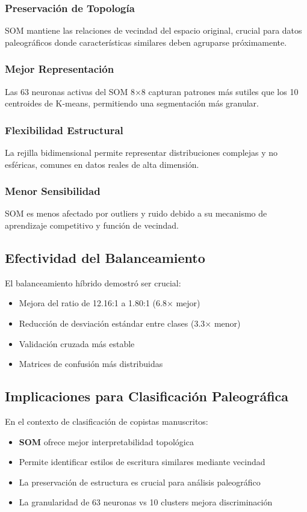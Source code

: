 \documentclass[12pt,a4paper]{article}
\begin{document}
\subsubsection{Preservación de Topología}
SOM mantiene las relaciones de vecindad del espacio original, crucial para datos paleográficos donde características similares deben agruparse próximamente.

\subsubsection{Mejor Representación}
Las 63 neuronas activas del SOM 8×8 capturan patrones más sutiles que los 10 centroides de K-means, permitiendo una segmentación más granular.

\subsubsection{Flexibilidad Estructural}
La rejilla bidimensional permite representar distribuciones complejas y no esféricas, comunes en datos reales de alta dimensión.

\subsubsection{Menor Sensibilidad}
SOM es menos afectado por outliers y ruido debido a su mecanismo de aprendizaje competitivo y función de vecindad.

\subsection{Efectividad del Balanceamiento}

El balanceamiento híbrido demostró ser crucial:
\begin{itemize}
    \item Mejora del ratio de 12.16:1 a 1.80:1 (6.8× mejor)
    \item Reducción de desviación estándar entre clases (3.3× menor)
    \item Validación cruzada más estable
    \item Matrices de confusión más distribuidas
\end{itemize}

\subsection{Implicaciones para Clasificación Paleográfica}

En el contexto de clasificación de copistas manuscritos:
\begin{itemize}
    \item \textbf{SOM} ofrece mejor interpretabilidad topológica
    \item Permite identificar estilos de escritura similares mediante vecindad
    \item La preservación de estructura es crucial para análisis paleográfico
    \item La granularidad de 63 neuronas vs 10 clusters mejora discriminación
\end{itemize}
\end{document}

